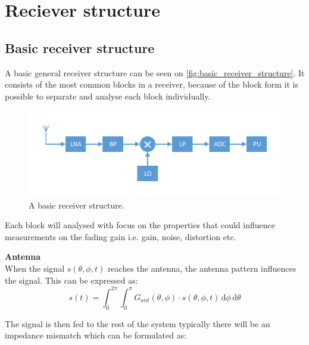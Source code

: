 \chapter{Reciever structure}

\section{Basic receiver structure}
\label{basic_rev_struct}
A basic general receiver structure can be seen on \autoref{fig:basic_receiver_structure}. It consists of the most common blocks in a receiver, because of the block form it is possible to separate and analyse each block individually. 

\begin{figure}[H]
\centering
\includegraphics[width= \textwidth]{figures/Receiver.pdf}
\caption{A basic receiver structure.}
\label{fig:basic_receiver_structure}
\end{figure}

Each block will analysed with focus on the properties that could influence measurements on the fading gain i.e. gain, noise, distortion etc.

\textbf{Antenna}\\
When the signal $s(\theta,\phi,t)$ reaches the antenna, the antenna pattern influences the signal. This can be expressed as:
\begin{equation}
s(t) = \int_0^{2\pi} \! \int_0^\pi G_{ant}(\theta,\phi)\cdot s(\theta,\phi,t) \,\text{d}\phi \,\text{d}\theta
\end{equation} 
\begin{where}
\end{where}
The signal is then fed to the rest of the system typically there will be an impedance mismatch which can be formulated as:

